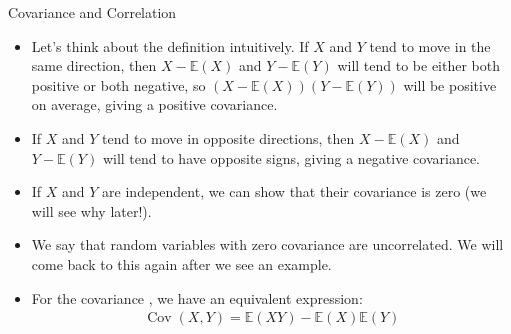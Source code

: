 \documentclass[8pt, usepdftitle=false]{beamer}
\begin{document}
\begin{frame}{Covariance and Correlation}


\begin{itemize}



  \item Let's think about the definition intuitively. If $X$ and $Y$ tend to move in the same direction, then $X- \mathbb{E}(X)$ and $Y-\mathbb{E}(Y)$ will tend to be either both positive or both negative, so $(X-\mathbb{E}(X))(Y-\mathbb{E}(Y))$ will be positive on average, giving a positive covariance. 


  \item If $X$ and $Y$ tend to move in opposite directions, then $X-\mathbb{E}(X)$ and $Y-\mathbb{E}(Y)$ will tend to have opposite signs, giving a negative covariance.

  \item If $X$ and $Y$ are independent, we can show that their covariance is zero (we will see why later!). 

  \item We say that random variables with zero covariance are \alert{uncorrelated}. We will come back to this again after we see an example.


    \item For the covariance , we have an equivalent expression:
    \begin{align*}
    \operatorname{Cov}(X, Y)=\mathbb{E}(X Y)-\mathbb{E}(X) \mathbb{E}(Y)
    \end{align*}

  \end{itemize}

\end{frame}
\end{document}
